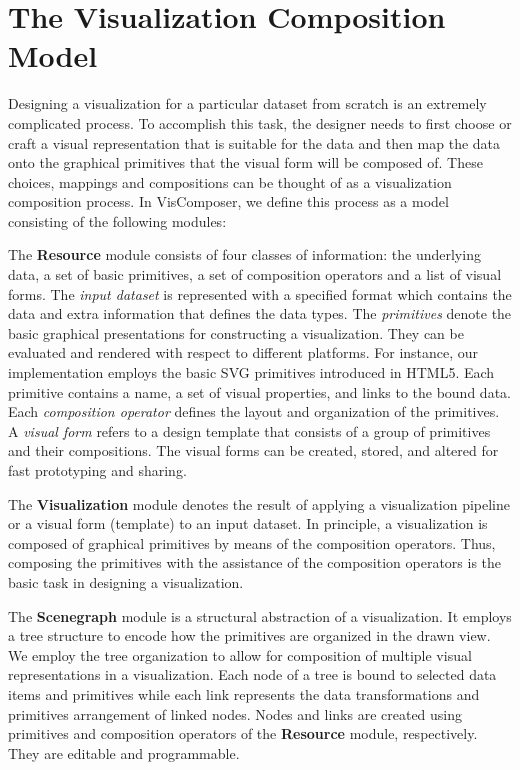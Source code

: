 \section{The Visualization Composition Model}
\label{sec:model}
Designing a visualization for a particular dataset from scratch is an extremely complicated process.  To accomplish this task, the designer needs to first choose or craft a visual representation that is suitable for the data and then map the data onto the graphical primitives that the visual form will be composed of.  These choices, mappings and compositions can be thought of as a visualization composition process.  In VisComposer, we define this  process as a model consisting of the following modules:

The \textbf{Resource} module consists of four classes of information: the underlying data, a set of basic primitives, a set of composition operators and a list of visual forms. The \emph{input dataset} is represented with a specified format which contains the data and extra information that defines the data types. The \emph{primitives} denote the basic graphical presentations for constructing a visualization. They can be evaluated and rendered with respect to different platforms. For instance, our implementation employs the basic SVG primitives introduced in HTML5.
 Each primitive contains a name, a set of visual properties, and links to the bound data. Each \emph{composition operator} defines the layout and organization of the primitives. A \emph{visual form} refers to a design template that consists of a group of primitives and their compositions. The visual forms can be created, stored, and altered for fast prototyping and sharing.

The \textbf{Visualization} module denotes the result of applying a visualization pipeline or a visual form (template) to an input dataset. In principle, a visualization is composed of graphical primitives by means of the composition operators. Thus, composing the primitives with the assistance of the composition operators is the basic task in designing a visualization. 

The \textbf{Scenegraph} module is a structural abstraction of a visualization. It employs a tree structure to encode how the primitives are organized in the drawn view. We employ the tree organization to allow for composition of multiple visual representations in a visualization. Each node of a tree is bound to selected data items and primitives while each link represents the data transformations and primitives arrangement of linked nodes. Nodes and links are created using primitives and composition operators of the \textbf{Resource} module, respectively. They are editable and programmable.

